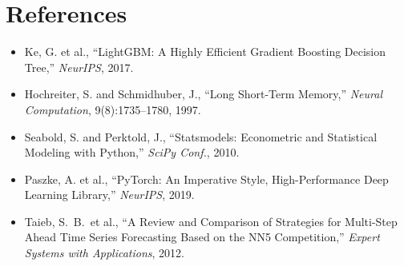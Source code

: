 \documentclass[11pt]{article}
\begin{document}
\section{References}

\begin{itemize}
  \item Ke, G. et al., ``LightGBM: A Highly Efficient Gradient Boosting
        Decision Tree,'' \emph{NeurIPS}, 2017.
  \item Hochreiter, S. and Schmidhuber, J., ``Long Short-Term Memory,''
        \emph{Neural Computation}, 9(8):1735--1780, 1997.
  \item Seabold, S. and Perktold, J., ``Statsmodels: Econometric and
        Statistical Modeling with Python,'' \emph{SciPy Conf.}, 2010.
  \item Paszke, A. et al., ``PyTorch: An Imperative Style, High-Performance
        Deep Learning Library,'' \emph{NeurIPS}, 2019.
  \item Taieb, S.~B.\ et al., ``A Review and Comparison of Strategies for
        Multi-Step Ahead Time Series Forecasting Based on the NN5
        Competition,'' \emph{Expert Systems with Applications}, 2012.
\end{itemize}
\end{document}

